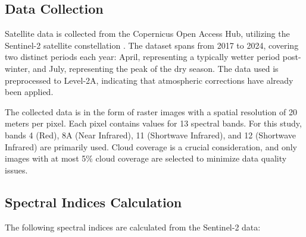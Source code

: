 \documentclass[10pt,twocolumn]{article}
\begin{document}
\subsection{Data Collection}
Satellite data is collected from the Copernicus Open Access Hub, utilizing the Sentinel-2 satellite constellation \cite{wang2016fusion}. The dataset spans from 2017 to 2024, covering two distinct periods each year: April, representing a typically wetter period post-winter, and July, representing the peak of the dry season. The data used is preprocessed to Level-2A, indicating that atmospheric corrections have already been applied.

The collected data is in the form of raster images with a spatial resolution of 20 meters per pixel. Each pixel contains values for 13 spectral bands. For this study, bands 4 (Red), 8A (Near Infrared), 11 (Shortwave Infrared), and 12 (Shortwave Infrared) are primarily used. Cloud coverage is a crucial consideration, and only images with at most 5\% cloud coverage are selected to minimize data quality issues.

\subsection{Spectral Indices Calculation}
The following spectral indices are calculated from the Sentinel-2 data:
\end{document}
